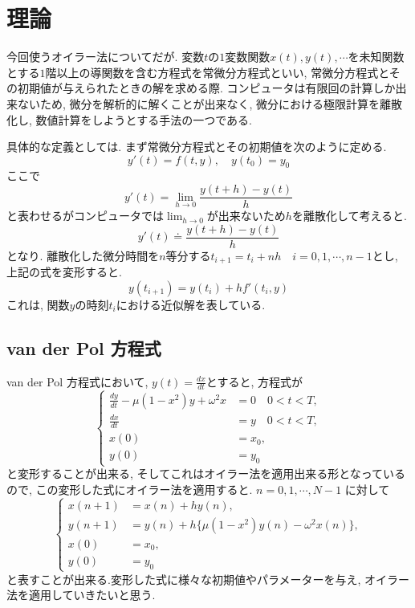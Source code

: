 \documentclass[12pt,a4paper]{jsarticle}
\begin{document}
\section{理論}
今回使うオイラー法についてだが. 変数$t$の$1$変数関数$x(t), y(t),\cdots$を未知関数とする$1$階以上の導関数を含む方程式を常微分方程式といい, 常微分方程式とその初期値が与えられたときの解を求める際. コンピュータは有限回の計算しか出来ないため, 微分を解析的に解くことが出来なく, 微分における極限計算を離散化し, 数値計算をしようとする手法の一つである.

具体的な定義としては. まず常微分方程式とその初期値を次のように定める.
$$ y'(t) = f(t, y), \quad y(t_0) = y_0$$
ここで$$ y'(t) = \lim_{h \to 0}\frac{y(t+h) - y(t)}{h} $$
と表わせるがコンピュータでは$\lim_{h \to 0}$が出来ないため$h$を離散化して考えると.
$$ y'(t) \doteq \frac{y(t+h) - y(t)}{h} $$
となり. 離散化した微分時間を$n$等分する$t_{i+1} = t_{i} + nh \quad i = 0, 1,\cdots, n-1$とし, 上記の式を変形すると.
$$ y(t_{i+1}) = y(t_i) + hf'(t_i, y) $$
これは, 関数$y$の時刻$t_i$における近似解を表している.

\subsection{van der Pol 方程式}
van der Pol 方程式において, $y(t) = \frac{dx}{dt}$とすると, 方程式が
\begin{equation*}
	\left\{
	\begin{aligned}
		\frac{dy}{dt} - \mu(1 - x^2)y + \omega^2x &= 0 \quad 0 < t < T, \\
		\frac{dx}{dt} &= y \quad 0 < t < T, \\
		x(0) &= x_0, \\
		y(0) &= y_0
	\end{aligned}
	\right.
\end{equation*}
と変形することが出来る, そしてこれはオイラー法を適用出来る形となっているので, この変形した式にオイラー法を適用すると. $n = 0, 1,\cdots, N-1$ に対して
\begin{equation*}
	\left\{
	\begin{aligned}
		x(n+1) &= x(n) + hy(n), \\
		y(n+1) &= y(n) + h\{\mu(1 - x^2)y(n) - \omega^2x(n)\}, \\
		x(0) &= x_0, \\
		y(0) &= y_0
	\end{aligned}
	\right.
\end{equation*}
と表すことが出来る.変形した式に様々な初期値やパラメーターを与え, オイラー法を適用していきたいと思う.
\end{document}
